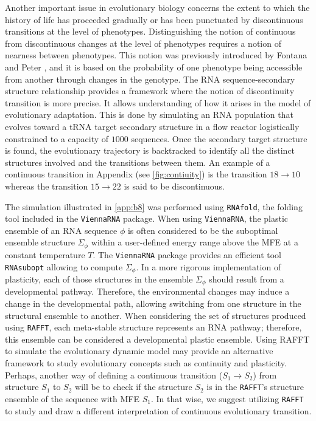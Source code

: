Another important issue in evolutionary biology concerns the extent to which the history of life has proceeded gradually or has been punctuated by discontinuous transitions at the level of phenotypes. Distinguishing the notion of continuous from discontinuous changes at the level of phenotypes requires a notion of nearness between phenotypes. This notion was previously introduced by Fontana and Peter \cite{fontana1998continuity}, and it is based on the probability of one phenotype being accessible from another through changes in the genotype. The \ac{RNA} sequence-secondary structure relationship provides a framework where the notion of discontinuity transition is more precise. It allows understanding of how it arises in the model of evolutionary adaptation. This is done by simulating an \ac{RNA} population that evolves toward a \ac{tRNA} target secondary structure in a flow reactor logistically constrained to a capacity of $1000$ sequences. Once the secondary target structure is found, the evolutionary trajectory is backtracked to identify all the distinct structures involved and the transitions between them. An example of a continuous transition in Appendix (see \autoref{fig:contiuity}) is the transition  $18 \rightarrow 10$ whereas the transition $15 \rightarrow 22$ is said to be discontinuous. 

The simulation illustrated in \autoref{app:b8} was performed using \texttt{RNAfold}, the folding tool included in the \texttt{ViennaRNA} package. When using \texttt{ViennaRNA}, the plastic ensemble of an \ac{RNA} sequence $\phi$ is often considered to be the suboptimal ensemble structure $\Sigma_{\phi}$ within a user-defined energy range above the \ac{MFE}  at a constant temperature $T$. The \texttt{ViennaRNA} package provides an efficient tool \texttt{RNAsubopt} allowing to compute $\Sigma_{\phi}$.  In a more rigorous implementation of plasticity, each of those structures in the ensemble $\Sigma_{\phi}$ should result from a developmental pathway. Therefore, the environmental changes may induce a change in the developmental path, allowing switching from one structure in the structural ensemble to another. When considering the set of structures produced using \texttt{RAFFT}, each meta-stable structure represents an \ac{RNA} pathway; therefore, this ensemble can be considered a developmental plastic ensemble. Using RAFFT to simulate the evolutionary dynamic model may provide an alternative framework to study evolutionary concepts such as continuity and plasticity. Perhaps, another way of defining a continuous transition ($S_1\rightarrow S_2$) from structure $S_1$ to $S_2$ will be to check if the structure $S_2$ is in the \texttt{RAFFT}'s structure ensemble of the sequence with \ac{MFE} $S_1$. In that wise, we suggest utilizing \texttt{RAFFT} to study and draw a different interpretation of continuous evolutionary transition.


